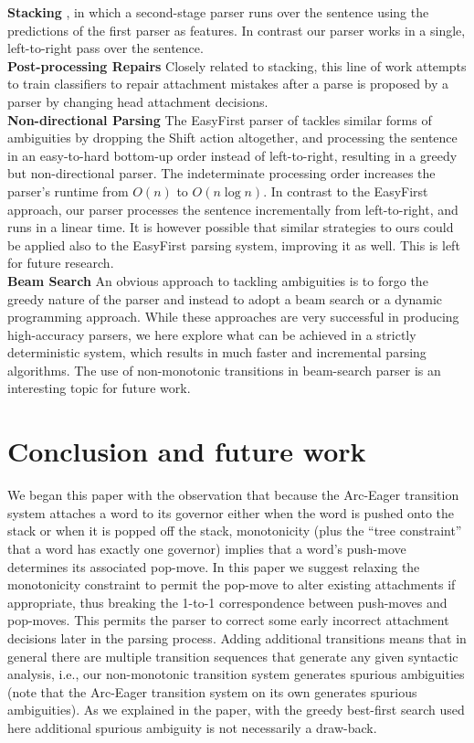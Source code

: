 \documentclass[11pt,letterpaper]{article}
\begin{document}
\noindent\textbf{Stacking} \citep{nivre-mcdonald-stacking,torresmartins:08:stacking}, in which a second-stage parser runs over the sentence using the predictions of the first parser as features. In contrast our parser works in a single, left-to-right pass over the sentence.\\
\noindent\textbf{Post-processing Repairs} \citep{attardi:07,hall05iwpt}
Closely related to stacking, this line of work attempts to train classifiers
to repair attachment mistakes after a parse is proposed by a parser by
changing head attachment decisions.\\
\noindent\textbf{Non-directional Parsing} 
The EasyFirst parser of \citet{goldberg10}
tackles similar forms of
ambiguities by dropping the Shift action altogether, and processing the
sentence in an easy-to-hard bottom-up order instead of left-to-right,
resulting in a greedy but non-directional parser.  The indeterminate
processing order increases the parser's runtime from $O(n)$ to $O(n\log{}n)$.
In contrast to the EasyFirst approach, our parser processes the sentence
incrementally from left-to-right, and runs in a linear time.  It is however
possible that similar strategies to ours could be applied also to the
EasyFirst parsing system, improving it as well. This is left for future
research.\\
\noindent\textbf{Beam Search} An obvious approach to tackling
ambiguities is to forgo the greedy nature of the parser and instead to adopt a
beam search \citep{zhang:08,zhang:11} or a dynamic programming \citep{huang:10,kuhlmann:11}
approach. While these approaches are very successful in producing
high-accuracy parsers, we here explore what can be achieved in a
strictly deterministic system, which results in much faster and incremental
parsing algorithms. The use of non-monotonic transitions in beam-search
parser is an interesting topic for future work.


\section{Conclusion and future work}

\noindent
We began this paper with the observation that because the Arc-Eager transition system \citep{nivre:04}
attaches a word to its governor either when the word is pushed onto the stack or when it is
popped off the stack, monotonicity (plus the ``tree constraint'' that a word has exactly one governor)
implies that a word's push-move determines its associated pop-move. In this paper we suggest relaxing
the monotonicity constraint to permit the pop-move to alter existing attachments if appropriate,
thus breaking the 1-to-1 correspondence between push-moves and pop-moves.  This permits the parser
to correct some early incorrect attachment decisions later in the parsing process.
Adding additional transitions means
that in general there are multiple transition sequences that generate any given syntactic analysis,
i.e., our non-monotonic transition system generates spurious ambiguities (note that the
Arc-Eager transition system on its own generates spurious ambiguities).
As we explained in the paper, with the greedy best-first search used here additional
spurious ambiguity is
not necessarily a draw-back.
\end{document}
